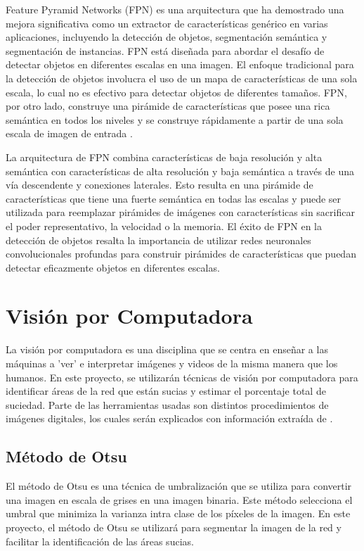 Feature Pyramid Networks (FPN) es una arquitectura que ha demostrado una mejora significativa como un extractor de características genérico en varias aplicaciones, incluyendo la detección de objetos, segmentación semántica y segmentación de instancias. FPN está diseñada para abordar el desafío de detectar objetos en diferentes escalas en una imagen. El enfoque tradicional para la detección de objetos involucra el uso de un mapa de características de una sola escala, lo cual no es efectivo para detectar objetos de diferentes tamaños. FPN, por otro lado, construye una pirámide de características que posee una rica semántica en todos los niveles y se construye rápidamente a partir de una sola escala de imagen de entrada \cite{cite:Tsung}.

La arquitectura de FPN combina características de baja resolución y alta semántica con características de alta resolución y baja semántica a través de una vía descendente y conexiones laterales. Esto resulta en una pirámide de características que tiene una fuerte semántica en todas las escalas y puede ser utilizada para reemplazar pirámides de imágenes con características sin sacrificar el poder representativo, la velocidad o la memoria. El éxito de FPN en la detección de objetos resalta la importancia de utilizar redes neuronales convolucionales profundas para construir pirámides de características que puedan detectar eficazmente objetos en diferentes escalas.


\section{Visión por Computadora}

La visión por computadora es una disciplina que se centra en enseñar a las máquinas a 'ver' e interpretar imágenes y videos de la misma manera que los humanos. En este proyecto, se utilizarán técnicas de visión por computadora para identificar áreas de la red que están sucias y estimar el porcentaje total de suciedad. Parte de las herramientas usadas son distintos procedimientos de imágenes digitales, los cuales serán explicados con información extraída de \cite{cite:Gonzalez}.

\subsection{Método de Otsu}

El método de Otsu es una técnica de umbralización que se utiliza para convertir una imagen en escala de grises en una imagen binaria. Este método selecciona el umbral que minimiza la varianza intra clase de los píxeles de la imagen. En este proyecto, el método de Otsu se utilizará para segmentar la imagen de la red y facilitar la identificación de las áreas sucias.

